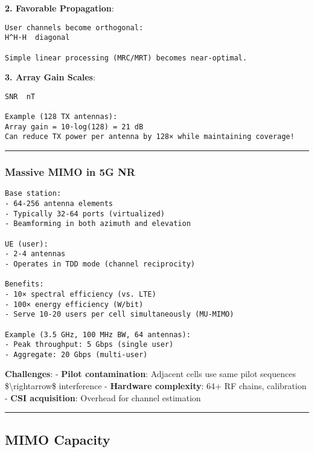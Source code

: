 \textbf{2. Favorable Propagation}:

\begin{verbatim}
User channels become orthogonal:
H^H·H  diagonal

Simple linear processing (MRC/MRT) becomes near-optimal.
\end{verbatim}

\textbf{3. Array Gain Scales}:

\begin{verbatim}
SNR  nT

Example (128 TX antennas):
Array gain = 10·log(128) = 21 dB
Can reduce TX power per antenna by 128× while maintaining coverage!
\end{verbatim}

\begin{center}\rule{0.5\linewidth}{0.5pt}\end{center}

\subsubsection{Massive MIMO in 5G NR}\label{massive-mimo-in-5g-nr}

\begin{verbatim}
Base station:
- 64-256 antenna elements
- Typically 32-64 ports (virtualized)
- Beamforming in both azimuth and elevation

UE (user):
- 2-4 antennas
- Operates in TDD mode (channel reciprocity)

Benefits:
- 10× spectral efficiency (vs. LTE)
- 100× energy efficiency (W/bit)
- Serve 10-20 users per cell simultaneously (MU-MIMO)

Example (3.5 GHz, 100 MHz BW, 64 antennas):
- Peak throughput: 5 Gbps (single user)
- Aggregate: 20 Gbps (multi-user)
\end{verbatim}

\textbf{Challenges}: - \textbf{Pilot contamination}: Adjacent cells use
same pilot sequences \$\textbackslash rightarrow\$ interference -
\textbf{Hardware complexity}: 64+ RF chains, calibration - \textbf{CSI
acquisition}: Overhead for channel estimation

\begin{center}\rule{0.5\linewidth}{0.5pt}\end{center}

\subsection{\texorpdfstring{ MIMO
Capacity}{ MIMO Capacity}}\label{mimo-capacity}

